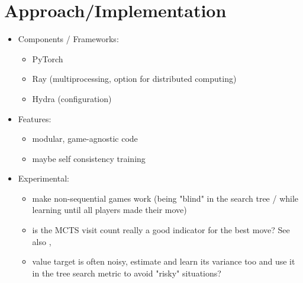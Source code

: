 \chapter{Approach/Implementation}
\label{approach}


\begin{itemize}
    \item Components / Frameworks:
    \begin{itemize}
        \item PyTorch
        \item Ray (multiprocessing, option for distributed computing) \cite{ray}
        \item Hydra (configuration) \cite{hydra}
    \end{itemize}
    \item Features:
    \begin{itemize}
        \item modular, game-agnostic code
        \item maybe self consistency training \cite{efficientzero}
    \end{itemize}
    \item Experimental:
    \begin{itemize}
        \item make non-sequential games work (being "blind" in the search tree /
        while learning until all players made their move)
        \item is the MCTS visit count really a good indicator for the
        best move?
        See also , 
        \item value target is often noisy, estimate and learn its variance too and use it
        in the tree search metric to avoid "risky" situations?
    \end{itemize}
\end{itemize}
